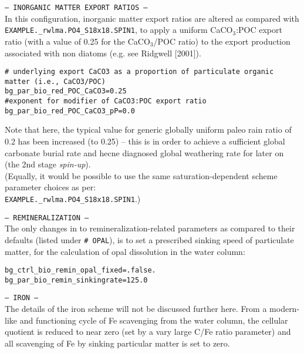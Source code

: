 \documentclass[10pt,twoside]{article}
\begin{document}
\begin{compactitem}
\item \texttt{--- INORGANIC MATTER EXPORT RATIOS ---}
\\In this configuration, inorganic matter export ratios are altered as compared with \texttt{EXAMPLE.\_rwlma.PO4\_S18x18.SPIN1}, to apply a uniform CaCO\(_{3}\):POC export ratio (with a value of 0.25 for the CaCO\(_{3}\)/POC ratio) to the export production associated with non diatoms (e.g. see Ridgwell [2001]). 
\vspace{-5pt}\begin{verbatim}
# underlying export CaCO3 as a proportion of particulate organic matter (i.e., CaCO3/POC)
bg_par_bio_red_POC_CaCO3=0.25
#exponent for modifier of CaCO3:POC export ratio
bg_par_bio_red_POC_CaCO3_pP=0.0
\end{verbatim}\vspace{-5pt}
Note that here, the typical value for generic globally uniform paleo rain ratio of 0.2 has been increased (to 0.25) -- this is in order to achieve a sufficient global carbonate burial rate and hecne diagnosed global weathering rate for later on (the 2nd stage \textit{spin-up}).
\\(Equally, it would be possible to use the same saturation-dependent scheme parameter choices as per:
\\\texttt{EXAMPLE.\_rwlma.PO4\_S18x18.SPIN1}.)

\item \texttt{--- REMINERALIZATION ---}
\\The only changes in to remineralization-related parameters as compared to their defaults (listed under \texttt{\# OPAL}), is to set a prescribed sinking speed of particulate matter, for the calculation of opal dissolution in the water column:
\vspace{-5pt}\begin{verbatim}
bg_ctrl_bio_remin_opal_fixed=.false.
bg_par_bio_remin_sinkingrate=125.0
\end{verbatim}\vspace{-5pt}

\item \texttt{--- IRON ---}
\\The details of the iron scheme will not be discussed further here. From a modern-like and functioning cycle of Fe scavenging from the water column, the cellular quotient is reduced to near zero (set by a vary large C/Fe ratio parameter) and all scavenging of Fe by sinking particular matter is set to zero.


\end{compactitem}
\end{document}
